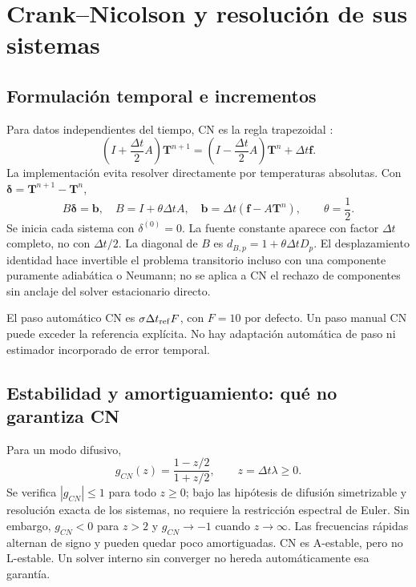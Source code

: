 \documentclass[11pt,a4paper]{article}
\newcommand{\dt}{\Delta t}
\begin{document}
\FloatBarrier
\section{Crank--Nicolson y resolución de sus sistemas}
\label{sec:cn}
\subsection{Formulación temporal e incrementos}
Para datos independientes del tiempo, CN es la regla trapezoidal
\cite{petsc,langtangen}:
\begin{equation}
 \left(I+\frac{\dt}{2}A\right)\boldsymbol T^{n+1}
 =\left(I-\frac{\dt}{2}A\right)\boldsymbol T^n+\dt\boldsymbol f.
 \label{eq:cn}
\end{equation}
La implementación evita resolver directamente por temperaturas absolutas.
Con $\boldsymbol\delta=\boldsymbol T^{n+1}-\boldsymbol T^n$,
\begin{equation}
 B\boldsymbol\delta=\boldsymbol b,
 \quad B=I+\theta\dt A,\quad
 \boldsymbol b=\dt(\boldsymbol f-A\boldsymbol T^n),
 \qquad \theta=\frac12.
 \label{eq:increment}
\end{equation}
Se inicia cada sistema con $\delta^{(0)}=0$. La fuente constante aparece con
factor $\dt$ completo, no con $\dt/2$. La diagonal de $B$ es
$d_{B,p}=1+\theta\dt D_p$. El desplazamiento identidad hace invertible el
problema transitorio incluso con una componente puramente adiabática o
Neumann; no se aplica a CN el rechazo de componentes sin anclaje del solver
estacionario directo.

El paso automático CN es $\sigma\dt_{\rm ref}F$, con $F=10$ por defecto.
Un paso manual CN puede exceder la referencia explícita. No hay adaptación
automática de paso ni estimador incorporado de error temporal.

\subsection{Estabilidad y amortiguamiento: qué no garantiza CN}
Para un modo difusivo,
\begin{equation}
 g_{CN}(z)=\frac{1-z/2}{1+z/2},\qquad z=\dt\lambda\ge0.
 \label{eq:gain}
\end{equation}
Se verifica $|g_{CN}|\le1$ para todo $z\ge0$; bajo las hipótesis de difusión
simetrizable y resolución exacta de los sistemas, no requiere la restricción
espectral de Euler. Sin embargo, $g_{CN}<0$ para $z>2$ y
$g_{CN}\to-1$ cuando $z\to\infty$. Las frecuencias rápidas alternan de signo
y pueden quedar poco amortiguadas. CN es A-estable, pero no L-estable.
Un solver interno sin converger no hereda automáticamente esa garantía.
\end{document}
